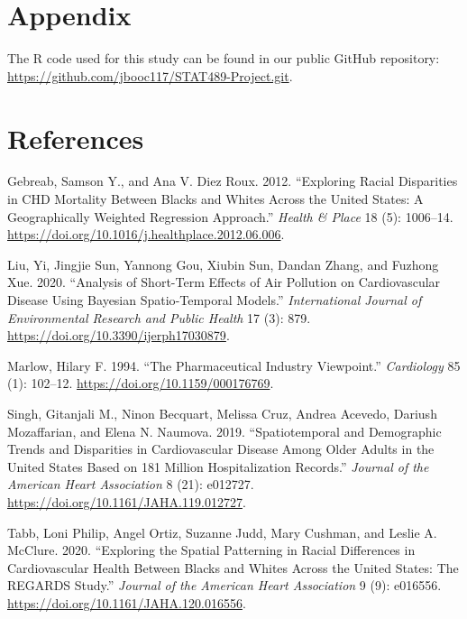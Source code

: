 \documentclass[
]{article}
\newlength{\cslhangindent}
\newenvironment{CSLReferences}[2] %
 {\begin{list}{}{%
  \setlength{\itemindent}{0pt}
  \setlength{\leftmargin}{0pt}
  \setlength{\parsep}{0pt}
  \ifodd #1
   \setlength{\leftmargin}{\cslhangindent}
   \setlength{\itemindent}{-1\cslhangindent}
  \fi
  \setlength{\itemsep}{#2\baselineskip}}}
 {\end{list}}
\begin{document}
\section{Appendix}\label{appendix}

The R code used for this study can be found in our public GitHub
repository: \url{https://github.com/jbooc117/STAT489-Project.git}.

\newpage{}

\section*{References}\label{references}

\label{refs}
\begin{CSLReferences}{1}{0}
Gebreab, Samson Y., and Ana V. Diez Roux. 2012. {``Exploring Racial
Disparities in {CHD} Mortality Between Blacks and Whites Across the
{United} {States}: {A} Geographically Weighted Regression Approach.''}
\emph{Health \& Place} 18 (5): 1006--14.
\url{https://doi.org/10.1016/j.healthplace.2012.06.006}.

Liu, Yi, Jingjie Sun, Yannong Gou, Xiubin Sun, Dandan Zhang, and Fuzhong
Xue. 2020. {``Analysis of {Short}-{Term} {Effects} of {Air} {Pollution}
on {Cardiovascular} {Disease} {Using} {Bayesian} {Spatio}-{Temporal}
{Models}.''} \emph{International Journal of Environmental Research and
Public Health} 17 (3): 879.
\url{https://doi.org/10.3390/ijerph17030879}.

Marlow, Hilary F. 1994. {``The Pharmaceutical Industry Viewpoint.''}
\emph{Cardiology} 85 (1): 102--12.
\url{https://doi.org/10.1159/000176769}.

Singh, Gitanjali M., Ninon Becquart, Melissa Cruz, Andrea Acevedo,
Dariush Mozaffarian, and Elena N. Naumova. 2019. {``Spatiotemporal and
{Demographic} {Trends} and {Disparities} in {Cardiovascular} {Disease}
{Among} {Older} {Adults} in the {United} {States} {Based} on 181
{Million} {Hospitalization} {Records}.''} \emph{Journal of the American
Heart Association} 8 (21): e012727.
\url{https://doi.org/10.1161/JAHA.119.012727}.

Tabb, Loni Philip, Angel Ortiz, Suzanne Judd, Mary Cushman, and Leslie
A. McClure. 2020. {``Exploring the {Spatial} {Patterning} in {Racial}
{Differences} in {Cardiovascular} {Health} {Between} {Blacks} and
{Whites} {Across} the {United} {States}: {The} {REGARDS} {Study}.''}
\emph{Journal of the American Heart Association} 9 (9): e016556.
\url{https://doi.org/10.1161/JAHA.120.016556}.


\end{CSLReferences}
\end{document}
